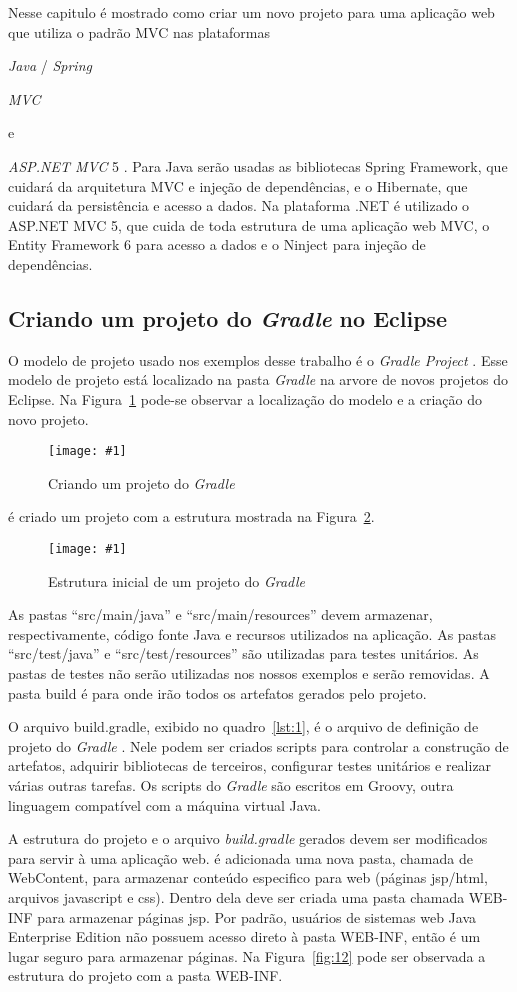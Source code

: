 \documentclass[a4paper,12pt]{article}
\newcommand{\anmvc} {
\sigla{ASP.NET MVC} 5
}
\newcommand{\spring} {
\lang{Java}/\est{Spring} \sigla{MVC}
}
\newcommand{\figura}[3] {
	\begin{figure}[ht]
		\centering
		\texttt{[image: \#1]}
		\caption{#2}
		\label{#3}
	\end{figure}
	\FloatBarrier
}
\newcommand{\est}[1] {
	\textit{#1}
}
\newcommand{\sigla}[1] {
	\textit{#1}
}
\newcommand{\lang}[1] {
	\textit{#1}
}
\newcommand{\groovycode}[3] {
	\setstretch{1.2}
	
	\setstretch{1.5}
}
\begin{document}
Nesse capitulo é mostrado como criar um novo projeto para uma aplicação web que utiliza o padrão MVC nas plataformas \spring e \anmvc. Para Java serão usadas as bibliotecas Spring Framework, que cuidará da arquitetura MVC e injeção de dependências, e o Hibernate, que cuidará da persistência e acesso a dados. Na plataforma .NET é utilizado o ASP.NET MVC 5, que cuida de toda estrutura de uma aplicação web MVC, o Entity Framework 6 para acesso a dados e o Ninject para injeção de dependências.

\subsection{Criando um projeto do \est{Gradle} no Eclipse}

O modelo de projeto usado nos exemplos desse trabalho é o \est{Gradle Project}. Esse modelo de projeto está localizado na pasta \est{Gradle} na arvore de novos projetos do Eclipse. Na Figura~\ref{fig:gradleproject} pode-se observar a localização do modelo e a criação do novo projeto.

\figura{gradleproject1.png}{Criando um projeto do \est{Gradle}}{fig:gradleproject}

é criado um projeto com a estrutura mostrada na Figura~\ref{fig:gradletree}.

\figura{gradleproject1.png}{Estrutura inicial de um projeto do \est{Gradle}}{fig:gradletree}

As pastas “src/main/java” e “src/main/resources” devem armazenar, respectivamente, código fonte Java e recursos utilizados na aplicação.  As pastas “src/test/java” e “src/test/resources” são utilizadas para testes unitários. As pastas de testes não serão utilizadas nos nossos exemplos e serão removidas. A pasta build é para onde irão todos os artefatos gerados pelo projeto.

O arquivo build.gradle, exibido no quadro~\ref{lst:1}, é o arquivo de definição de projeto do \est{Gradle}. Nele podem ser criados scripts para controlar a construção de artefatos, adquirir bibliotecas de terceiros, configurar testes unitários e realizar várias outras tarefas. Os scripts do \est{Gradle} são escritos em Groovy, outra linguagem compatível com a máquina virtual Java. 

\groovycode{code/buildgradle.txt}{O arquivo \est{build.gradle}}{lst:1}

A estrutura do projeto e o arquivo \est{build.gradle} gerados devem ser modificados para servir à uma aplicação web. é adicionada uma nova pasta, chamada de WebContent, para armazenar conteúdo especifico para web (páginas jsp/html, arquivos javascript e css). Dentro dela deve ser criada uma pasta chamada WEB-INF para armazenar páginas jsp. Por padrão, usuários de sistemas web Java Enterprise Edition não possuem acesso direto à pasta WEB-INF, então é um lugar seguro para armazenar páginas. Na Figura~\ref{fig:12} pode ser observada a estrutura do projeto com a pasta WEB-INF.
\end{document}

